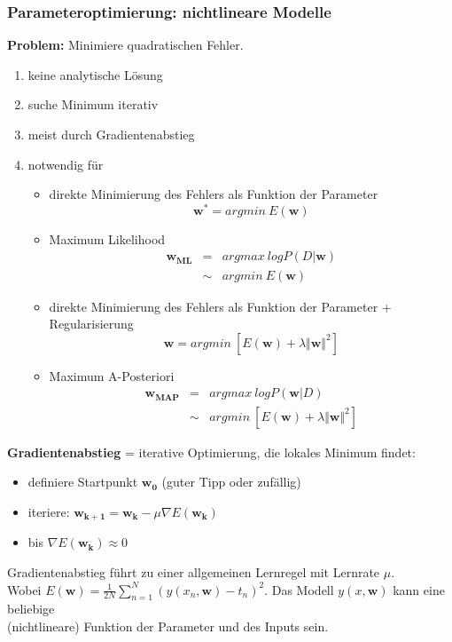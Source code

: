 	\subsubsection{Parameteroptimierung: nichtlineare Modelle}
	\textbf{Problem:} Minimiere quadratischen Fehler.\vspace*{-5pt}
	\begin{enumerate}[$\hookrightarrow$]
		\item keine analytische Lösung
		\item suche Minimum iterativ
		\item meist durch Gradientenabstieg
		\item notwendig für
		\begin{itemize}
			\item direkte Minimierung des Fehlers als Funktion der Parameter
			\begin{equation*}
				\pmb{w^*}= argmin ~ E(\pmb{w})
			\end{equation*}
			\item Maximum Likelihood
			\begin{eqnarray*}
				\pmb{w_{ML}}&=&argmax ~logP(D\vert \pmb{w})\\
				&\sim& argmin~E(\pmb{w})
			\end{eqnarray*}
			\item direkte Minimierung des Fehlers als Funktion der Parameter + Regularisierung
			\begin{equation*}
				\pmb{w}=argmin ~[E(\pmb{w})+\lambda\Vert\pmb{w}\Vert^2]
			\end{equation*}
			\item Maximum A-Posteriori
			\begin{eqnarray*}
				\pmb{w_{MAP}} &=& argmax~logP(\pmb{w}\vert D)\\
				&\sim&argmin ~[E(\pmb{w})+\lambda\Vert\pmb{w}\Vert^2]
			\end{eqnarray*}
		\end{itemize}
	\end{enumerate}
	\textbf{Gradientenabstieg} = iterative Optimierung, die lokales Minimum findet:
	\begin{itemize}
		\item definiere Startpunkt $\pmb{w_0}$ (guter Tipp oder zufällig)
		\item iteriere: $\pmb{w_{k+1}}=\pmb{w_k}-\mu\nabla E(\pmb{w_k})$
		\item bis $\nabla E(\pmb{w_k})\approx0$
	\end{itemize}	
	Gradientenabstieg führt zu einer allgemeinen Lernregel mit Lernrate $\mu$.\\[5pt] Wobei $E(\pmb{w}) = \frac{1}{2N}\sum_{n=1}^N(y(x_n, \pmb{w})-t_n)^2$. Das Modell $y(x,\pmb{w})$ kann eine beliebige\\[5pt] (nichtlineare) Funktion der Parameter und des Inputs sein.
